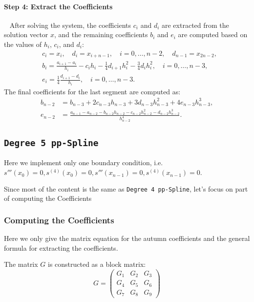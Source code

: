 \documentclass{article}
\begin{document}
\paragraph{Step 4: Extract the Coefficients}~{}\newline
After solving the system, the coefficients \( c_i \) and \( d_i \) are extracted from the solution vector \( x \), and the remaining coefficients \( b_i \) and \( e_i \) are computed based on the values of \( h_i \), \( c_i \), and \( d_i \):
\begin{align*}
    &c_i = x_i, \quad d_i = x_{i + n - 1}, \quad i = 0, \ldots, n-2,\quad d_{n-1} = x_{2n - 2}, \\
    &b_i = \frac{a_{i+1} - a_i}{h_i} - c_i h_i - \frac{1}{4} d_{i+1} h_i^2 - \frac{3}{4} d_i h_i^2, \quad i = 0, \ldots, n-3, \\
    &e_i = \frac{1}{4} \frac{d_{i+1} - d_i}{h_i}, \quad i = 0, \ldots, n-3.
\end{align*}
The final coefficients for the last segment are computed as:
\begin{align*}
    b_{n-2} &= b_{n-3} + 2 c_{n-3} h_{n-3} + 3 d_{n-3} h_{n-3}^2 + 4 e_{n-3} h_{n-3}^3, \\
    e_{n-2} &= \frac{a_{n-1} - a_{n-2} - b_{n-2} h_{n-2} - c_{n-2} h_{n-2}^2 - d_{n-2} h_{n-2}^3}{h_{n-2}^4}.
\end{align*}


\subsection{\texttt{Degree 5 pp-Spline}}

Here we implement only one boundary condition, i.e. \( s'''(x_0)=0, s^{(4)}(x_0)=0, s'''(x_{n-1})=0, s^{(4)}(x_{n-1})=0 \).

Since most of the content is the same as \texttt{Degree 4 pp-Spline}, let's focus on part of computing the Coefficients
\subsubsection{Computing the Coefficients}
Here we only give the matrix equation for the autumn coefficients and the general formula for extracting the coefficients.\par
The matrix \( G \) is constructed as a block matrix:
\[
G =
\begin{pmatrix}
G_1 & G_2 & G_3\\
G_4 & G_5 & G_6\\
G_7 & G_8 & G_9
\end{pmatrix}
\]
\end{document}
